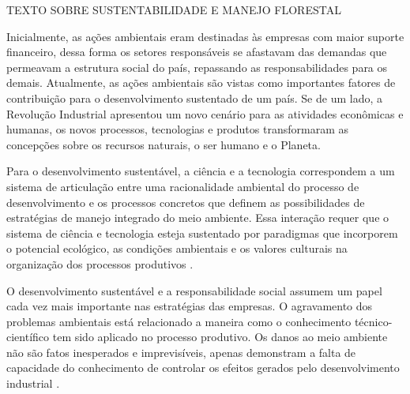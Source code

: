 % 
% 




TEXTO SOBRE SUSTENTABILIDADE E MANEJO FLORESTAL


Inicialmente, as ações ambientais eram destinadas às empresas com maior suporte financeiro, dessa forma os setores responsáveis se afastavam das demandas que permeavam a estrutura social do país, repassando as responsabilidades para os demais. Atualmente, as ações ambientais são vistas como importantes fatores de contribuição para o desenvolvimento sustentado de um país. Se de um lado, a Revolução Industrial apresentou um novo cenário para as atividades econômicas e humanas, os novos processos, tecnologias e produtos transformaram as concepções sobre os recursos naturais, o ser humano e o Planeta. 


Para o desenvolvimento sustentável, a ciência e a tecnologia correspondem a um sistema de articulação entre uma racionalidade ambiental do processo de desenvolvimento e os processos concretos que definem as possibilidades de estratégias de manejo integrado do meio ambiente. Essa interação requer que o sistema de ciência e tecnologia esteja sustentado por paradigmas que incorporem o potencial ecológico, as condições ambientais e os valores culturais na organização dos processos produtivos \cite{Furlan2018}.

O desenvolvimento sustentável e a responsabilidade social assumem um papel cada vez mais importante nas estratégias das empresas. O agravamento dos problemas ambientais está relacionado a maneira como o conhecimento técnico-científico tem sido aplicado no processo produtivo. Os danos ao meio ambiente não são fatos inesperados e imprevisíveis, apenas demonstram a falta de capacidade do conhecimento de controlar os efeitos gerados pelo desenvolvimento industrial \cite{Maranhao2016}. 


